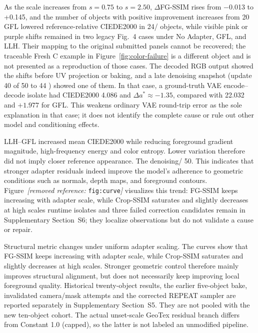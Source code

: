 \documentclass[times,twocolumn,final]{elsarticle}
\providecommand{\DIFadd}[1]{{\protect\color{blue} \sf #1}} %
\providecommand{\DIFdel}[1]{{\protect\color{red} \scriptsize #1}} %
\providecommand{\DIFaddbegin}{} %
\providecommand{\DIFaddend}{} %
\providecommand{\DIFdelbegin}{} %
\providecommand{\DIFdelend}{} %
\providecommand{\DIFdelFL}[1]{\DIFdel{#1}} %
\begin{document}
\DIFdelbegin \DIFdel{As the scale increases from $s = 0.75$ to $s = 2.50$, $\Delta$FG-SSIM rises from $-$0.013 to +0.145, and the number of objects with positive improvement increases from 20}\DIFdelend \DIFaddbegin \DIFadd{GFL lowered reference-relative CIEDE2000 in 24}\DIFaddend /\DIFaddbegin \DIFadd{26 objects, while visible pink or purple shifts remained in two legacy Fig.~4 cases under No Adapter, GFL, and LLH. Their mapping to the original submitted panels cannot be recovered; the traceable Fresh C example in Figure~\ref{fig:color-failure} is a different object and is not presented as a reproduction of those cases. The decoded RGB output showed the shifts before UV projection or baking, and a late denoising snapshot (update 40 of }\DIFaddend 50\DIFdelbegin \DIFdel{to 44}\DIFdelend \DIFaddbegin \DIFadd{) showed one of them. In that case, a ground-truth VAE encode--decode isolate had CIEDE2000 4.086 and $\Delta a^*\approx-1.35$, compared with 22.032 and $+1.977$ for GFL. This weakens ordinary VAE round-trip error as the sole explanation in that case; it does not identify the complete cause or rule out other model and conditioning effects.
}

\DIFadd{LLH--GFL increased mean CIEDE2000 while reducing foreground gradient magnitude, high-frequency energy and color entropy. Lower variation therefore did not imply closer reference appearance. The denoising}\DIFaddend /\DIFdelbegin \DIFdel{50. This indicates that stronger adapter residuals indeed improve the model's adherence to geometric conditions such as normals, depth maps, and foreground contours.
Figure~\textit{[removed reference: }\texttt{fig:curve}\textit{]} visualizes this trend: FG-SSIM keeps increasing with adapter scale, while Crop-SSIM saturates and slightly decreases at high scales}\DIFdelend \DIFaddbegin \DIFadd{runtime isolates and three failed correction candidates remain in Supplementary Section~S6; they localize observations but do not validate a cause or repair}\DIFaddend .

\DIFdelbegin %
{%
\DIFdelFL{Structural metric changes under uniform adapter scaling. The curves show that FG-SSIM keeps increasing with adapter scale, while Crop-SSIM saturates and slightly decreases at high scales. Stronger geometric control therefore mainly improves structural alignment, but does not necessarily keep improving local foreground quality.}}
\DIFdelend \DIFaddbegin \DIFadd{Historical twenty-object results, the earlier five-object bake, invalidated camera/mask attempts and the corrected REPEAT sampler are reported separately in Supplementary Section~S5. They are not pooled with the new ten-object cohort. The actual unset-scale GeoTex residual branch differs from Constant 1.0 (capped), so the latter is not labeled an unmodified pipeline.
}\DIFaddend 
\end{document}
